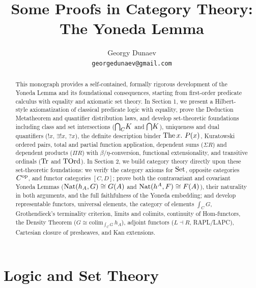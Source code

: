 \documentclass[10pt,a4paper]{article}
\title{Some Proofs in Category Theory: The Yoneda Lemma}
\author{Georgy Dunaev \\ \texttt{georgedunaev@gmail.com}}
\date{}
\begin{document}
\sloppy
\maketitle

\begin{abstract}
This monograph provides a self-contained, formally rigorous development of the Yoneda Lemma and its foundational consequences, starting from first-order predicate calculus with equality and axiomatic set theory. In Section 1, we present a Hilbert-style axiomatization of classical predicate logic with equality, prove the Deduction Metatheorem and quantifier distribution laws, and develop set-theoretic foundations including class and set intersections (${{\bigcap}_C} K$ and ${\bigcap} K$), uniqueness and dual quantifiers ($!x$, $\exists !x$, $?x$), the definite description binder $\The x.\ P(x)$, Kuratowski ordered pairs, total and partial function application, dependent sums ($\Sigma R$) and dependent products ($\Pi R$) with $\beta/\eta$-conversion, functional extensionality, and transitive ordinals (${\textrm{Tr}}$ and ${\textrm{TOrd}}$). In Section 2, we build category theory directly upon these set-theoretic foundations: we verify the category axioms for ${\textrm{Set}}$, opposite categories $C^{\textrm{op}}$, and functor categories $[C, D]$; prove both the contravariant and covariant Yoneda Lemmas (${\textrm{Nat}}(h_A, G) \cong G(A)$ and ${\textrm{Nat}}(h^A, F) \cong F(A)$), their naturality in both arguments, and the full faithfulness of the Yoneda embedding; and develop representable functors, universal elements, the category of elements $\int_C G$, Grothendieck's terminality criterion, limits and colimits, continuity of Hom-functors, the Density Theorem ($G \cong \mathrm{colim}_{\int_C G}\, h_A$), adjoint functors ($L \dashv R$, RAPL/LAPC), Cartesian closure of presheaves, and Kan extensions.
\end{abstract}

\tableofcontents

\section{Logic and Set Theory}\label{sec:logic_set}
\end{document}
